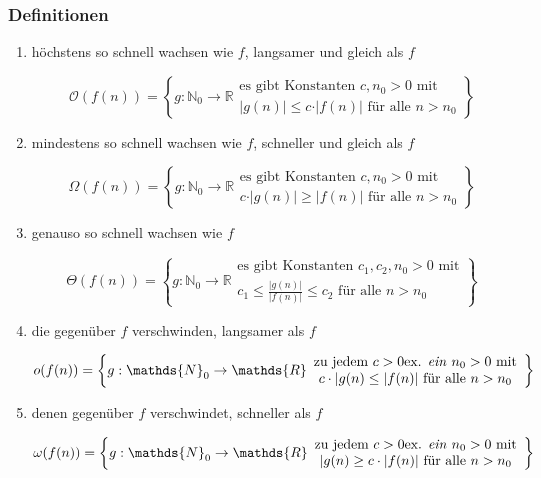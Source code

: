 \documentclass{scrartcl}
\begin{document}
\subsubsection{Definitionen}
\begin{enumerate}
	\item höchstens so schnell wachsen wie $f$, {\tiny langsamer und gleich als $f$}
	\begin{shaded}
	\[ \mathcal{O}(f(n)) = \left\lbrace g: \mathds{N}_0 \to \mathds{R}
	\begin{array}{c}
	\textrm{es gibt Konstanten } c,n_0>0 \textrm{ mit} \\
	\vert g(n) \vert \leq c \cdot \vert f(n) \vert \textrm{ für alle } n>n_0
	\end{array}
	\right\rbrace \]
	\end{shaded}
	\item mindestens so schnell wachsen wie $f$, {\tiny schneller und gleich als $f$}
	\begin{shaded}
	\[ \Omega (f(n)) = \left\lbrace g: \mathds{N}_0 \to \mathds{R}
	\begin{array}{c}
	\textrm{es gibt Konstanten } c,n_0>0 \textrm{ mit} \\
	c \cdot \vert g(n) \vert \geq \vert f(n) \vert \textrm{ für alle } n>n_0
	\end{array}
	\right\rbrace \]
	\end{shaded}
	\item genauso so schnell wachsen wie $f$
	\begin{shaded}
	\[ \Theta(f(n)) = \left\lbrace g: \mathds{N}_0 \to \mathds{R}
	\begin{array}{c}
	\textrm{es gibt Konstanten } c_1,c_2,n_0>0 \textrm{ mit} \\
	c_1 \leq \frac{\vert g(n) \vert}{\vert f(n) \vert} \leq c_2 \textrm{ für alle } n>n_0
	\end{array}
	\right\rbrace \]
	\end{shaded}
	\item die gegenüber $f$ verschwinden, {\tiny langsamer als $f$}
	\begin{shaded}
	\[ o(f(n)) = \left\lbrace g: \mathds{N}_0 \to \mathds{R}
	\begin{array}{c}
	\textrm{zu jedem } c>0 \textrm{ex. \emph{ein} } n_0>0 \textrm{ mit} \\
	c \cdot \vert g(n) \leq \vert f(n) \vert \textrm{ für alle } n>n_0
	\end{array}
	\right\rbrace \]
	\end{shaded}
	\item denen gegenüber $f$ verschwindet, {\tiny schneller als $f$}
	\begin{shaded}
	\[ \omega(f(n)) = \left\lbrace g: \mathds{N}_0 \to \mathds{R}
	\begin{array}{c}
	\textrm{zu jedem } c>0 \textrm{ex. \emph{ein} } n_0>0 \textrm{ mit} \\
	\vert g(n) \geq c \cdot \vert f(n) \vert \textrm{ für alle } n>n_0
	\end{array}
	\right\rbrace \]
	\end{shaded}
\end{enumerate}
\end{document}
